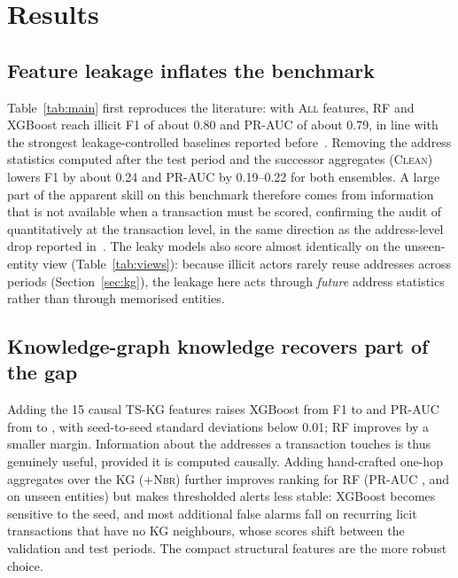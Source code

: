 \section{Results}\label{sec:results}



\subsection{Feature leakage inflates the benchmark}
Table~\ref{tab:main} first reproduces the literature: with \textsc{All}
features, RF and XGBoost reach illicit F1 of about 0.80 and PR-AUC of about 0.79,
in line with the strongest leakage-controlled baselines reported
before~\cite{maganti2026,ichull2026twin}. Removing the address statistics
computed after the test period and the successor aggregates
(\textsc{Clean}) lowers F1 by about 0.24 and PR-AUC by 0.19--0.22 for both
ensembles. A large part of the apparent skill on this benchmark therefore
comes from information that is not available when a transaction must be
scored, confirming the audit of~\cite{safar2026} quantitatively at the
transaction level, in the same direction as the address-level drop reported
in~\cite{liang2026}. The leaky models also score almost identically on the
unseen-entity view (Table~\ref{tab:views}): because illicit actors rarely
reuse addresses across periods (Section~\ref{sec:kg}), the leakage here acts
through \emph{future} address statistics rather than through memorised
entities.

\subsection{Knowledge-graph knowledge recovers part of the gap}
Adding the 15 causal TS-KG features raises XGBoost from F1
\XgbCleanFone{} to \XgbCleanKgFone{} and PR-AUC
from \XgbCleanPr{} to \XgbCleanKgPr{},
with seed-to-seed standard deviations below 0.01; RF improves by a smaller
margin. Information about the addresses a transaction touches is thus genuinely
useful, provided it is computed causally. Adding hand-crafted one-hop
aggregates over the KG (\textsc{+Nbr}) further improves ranking for RF
(PR-AUC \RfCleanKgNbrPr{}, and \RfCleanKgNbrUnseenPr{} on unseen entities) but
makes thresholded alerts less stable: XGBoost becomes sensitive to the seed,
and most additional false alarms fall on recurring licit transactions that
have no KG neighbours, whose scores shift between the validation and test
periods. The compact structural features are the more robust choice.

